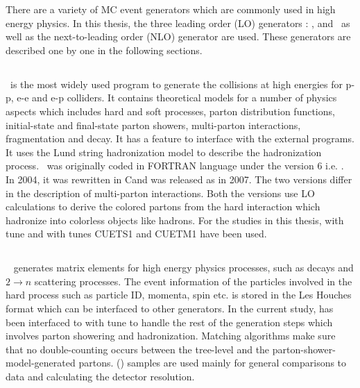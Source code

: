 There are a variety of MC event generators which are commonly used in high energy physics. In this thesis, the three leading order (LO) generators : \PYTHIA, \MadGraphF and \HERWIG~as well as the next-to-leading order (NLO) generator \POWHEG are used. These generators are described one by one in the following sections.

\subsection{\PYTHIA}
\PYTHIA~is the most widely used program to generate the collisions at high energies for p-p, e-e and e-p colliders. It contains theoretical models for a number of physics aspects which includes hard and soft processes, parton distribution functions, initial-state and final-state parton showers, multi-parton interactions, fragmentation and decay. It has a feature to interface with the external programs. It uses the Lund string hadronization model \cite{Lund} to describe the hadronization process. \PYTHIA~was originally coded in FORTRAN language under the version 6 i.e. \PYTHIAS \cite{Sjostrand:2006za}. In 2004, it was rewritten in C\plusn\plus and was released as \PYTHIAE \cite{Sjostrand:2007gs} in 2007. The two versions differ in the description of multi-parton interactions. Both the versions use LO calculations to derive the colored partons from the hard interaction which hadronize into colorless objects like hadrons. For the studies in this thesis, \PYTHIAS with tune \Ztwostar \cite{Field:2011iq} and \PYTHIAE with tunes CUETS1 and CUETM1 \cite{Khachatryan:2015pea} have been used. 

\subsection{\MadGraphF}
\MadGraphF~\cite{Alwall:2011uj} generates matrix elements for high energy physics processes, such as decays and $2 \rightarrow n$ scattering processes. The event information of the particles involved in the hard process such as particle ID, momenta, spin etc. is stored in the Les Houches format \cite{Alwall:2006yp} which can be interfaced to other generators. In the current study, \MadGraphF has been interfaced to \PYTHIAS with tune \Ztwostar to handle the rest of the generation steps which involves parton showering and hadronization. Matching algorithms make sure that no double-counting occurs between the tree-level and the parton-shower-model-generated partons. \MadGraphFn\plusn \PYTHIAS (\MGP) samples are used mainly for general comparisons to data and calculating the detector resolution. 

